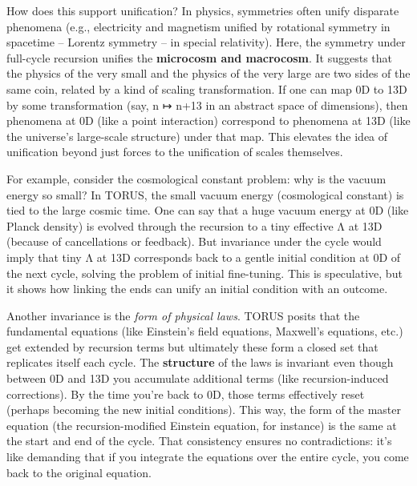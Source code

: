 \documentclass[]{article}
\begin{document}
How does this support unification? In physics, symmetries often unify
disparate phenomena (e.g., electricity and magnetism unified by
rotational symmetry in spacetime -- Lorentz symmetry -- in special
relativity). Here, the symmetry under full-cycle recursion unifies the
\textbf{microcosm and macrocosm}. It suggests that the physics of the
very small and the physics of the very large are two sides of the same
coin, related by a kind of scaling transformation. If one can map 0D to
13D by some transformation (say, n ↦ n+13 in an abstract space of
dimensions), then phenomena at 0D (like a point interaction) correspond
to phenomena at 13D (like the universe's large-scale structure) under
that map. This elevates the idea of unification beyond just forces to
the unification of scales themselves.

For example, consider the cosmological constant problem: why is the
vacuum energy so small? In TORUS, the small vacuum energy (cosmological
constant) is tied to the large cosmic time. One can say that a huge
vacuum energy at 0D (like Planck density) is evolved through the
recursion to a tiny effective Λ at 13D (because of cancellations or
feedback). But invariance under the cycle would imply that tiny Λ at 13D
corresponds back to a gentle initial condition at 0D of the next cycle,
solving the problem of initial fine-tuning. This is speculative, but it
shows how linking the ends can unify an initial condition with an
outcome.

Another invariance is the \emph{form of physical laws}. TORUS posits
that the fundamental equations (like Einstein's field equations,
Maxwell's equations, etc.) get extended by recursion terms but
ultimately these form a closed set that replicates itself each cycle.
The \textbf{structure} of the laws is invariant even though between 0D
and 13D you accumulate additional terms (like recursion-induced
corrections). By the time you're back to 0D, those terms effectively
reset (perhaps becoming the new initial conditions). This way, the form
of the master equation (the recursion-modified Einstein equation, for
instance) is the same at the start and end of the cycle​. That
consistency ensures no contradictions: it's like demanding that if you
integrate the equations over the entire cycle, you come back to the
original equation.
\end{document}
